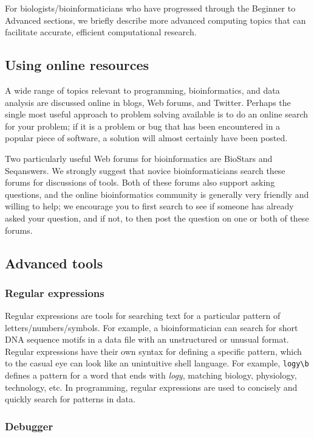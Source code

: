 \documentclass[ChapterTOCs,krantz2]{krantz} %
\begin{document}
For biologists/bioinformaticians who have progressed through the Beginner
to Advanced sections, we briefly describe more advanced computing topics 
that can facilitate accurate, efficient computational research.

\subsection{Using online resources}

A wide range of topics relevant to programming, bioinformatics, and
data analysis are discussed online in blogs, Web forums, and Twitter.
Perhaps the single most useful approach to problem solving available
is to do an online search for your problem; if it is a problem or bug
that has been encountered in a popular piece of software, a solution will
almost certainly have been posted.

Two particularly useful Web forums for bioinformatics are BioStars and
Seqanswers.  We strongly suggest that novice bioinformaticians
search these forums for discussions of tools.  Both of these forums
also support asking questions, and the online bioinformatics community
is generally very friendly and willing to help; we encourage you to
first search to see if someone has already asked your question, and if
not, to then post the question on one or both of these forums.

\subsection{Advanced tools}

\subsubsection{Regular expressions}

Regular expressions are tools for
searching text for a particular pattern of letters/numbers/symbols.  For
example, a bioinformatician can search for short DNA sequence motifs in 
a data file with an unstructured or unusual format.  Regular expressions have their own
syntax for defining a specific pattern, which to the casual eye can look like
an unintuitive shell language. For example, \texttt{logy\textbackslash{}b} defines a pattern for a word
that ends with \emph{logy}, matching biology, physiology, technology, etc.
In programming, regular expressions are
used to concisely and quickly search for patterns in data.

\subsubsection{Debugger}
\end{document}
